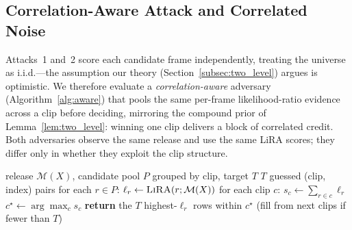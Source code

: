 \documentclass[sigconf,anonymous, review]{acmart}
\begin{document}
\subsection{Correlation-Aware Attack and Correlated Noise}
\label{subsec:correlation_aware_exp}

Attacks~1 and~2 score each candidate frame independently, treating the universe as i.i.d.---the assumption our theory (Section~\ref{subsec:two_level}) argues is optimistic. We therefore evaluate a \emph{correlation-aware} adversary (Algorithm~\ref{alg:aware}) that pools the same per-frame likelihood-ratio evidence across a clip before deciding, mirroring the compound prior of Lemma~\ref{lem:two_level}: winning one clip delivers a block of correlated credit. Both adversaries observe the same release and use the same LiRA scores; they differ only in whether they exploit the clip structure.

\begin{algorithm}[t]
\caption{Correlation-aware temporal MIA}
\label{alg:aware}
\begin{algorithmic}[1]
\Require release $\mathcal{M}(X)$, candidate pool $P$ grouped by clip, target $T$
\Ensure  $T$ guessed (clip, index) pairs
\State for each $r\in P$: $\ell_r \gets \textsc{LiRA}(r; \mathcal{M}(X))$ 
\State for each clip $c$: $s_c \gets \sum_{r\in c}\ell_r$ 
\State $c^\star \gets \arg\max_c s_c$ 
\State \textbf{return} the $T$ highest-$\ell_r$ rows within $c^\star$ (fill from next clips if fewer than $T$)
\end{algorithmic}
\end{algorithm}
\end{document}
